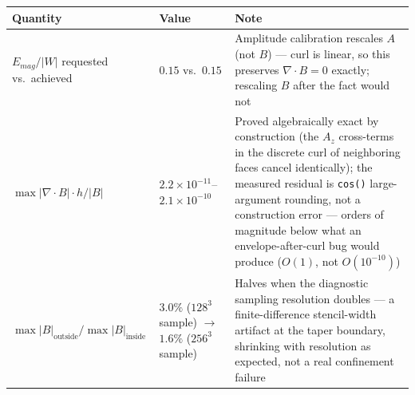 \documentclass[11pt,a4paper]{scrartcl}
\newcommand{\code}[1]{\texttt{\small #1}}
\begin{document}
\begin{center}
\begin{tabular}{@{}p{4.6cm}p{3.0cm}p{6.6cm}@{}}
\toprule
Quantity & Value & Note\\
\midrule
$E_{mag}/|W|$ requested vs.\ achieved & $0.15$ vs.\ $0.15$ & Amplitude calibration rescales $A$ (not $B$) --- curl is linear, so this preserves $\nabla\cdot B=0$ exactly; rescaling $B$ after the fact would not\\
$\max|\nabla\cdot B|\cdot h/|B|$ & $2.2\times10^{-11}$--$2.1\times10^{-10}$ & Proved algebraically exact by construction (the $A_z$ cross-terms in the discrete curl of neighboring faces cancel identically); the measured residual is \code{cos()} large-argument rounding, not a construction error --- orders of magnitude below what an envelope-after-curl bug would produce ($O(1)$, not $O(10^{-10})$)\\
$\max|B|_{\text{outside}}/\max|B|_{\text{inside}}$ & $3.0\%$ ($128^3$ sample) $\to$ $1.6\%$ ($256^3$ sample) & Halves when the diagnostic sampling resolution doubles --- a finite-difference stencil-width artifact at the taper boundary, shrinking with resolution as expected, not a real confinement failure\\
\bottomrule
\end{tabular}
\end{center}
\end{document}
